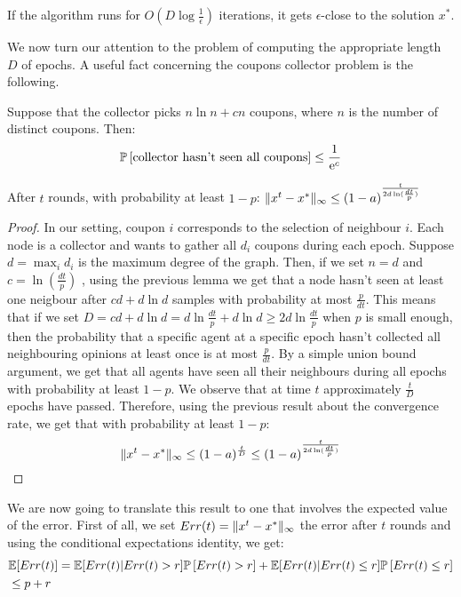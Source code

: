 \begin{corollary}
If the algorithm runs for $O(D \log \frac{1}{\epsilon})$ iterations, it gets $\epsilon$-close to the solution $x^*$.
\end{corollary}

We now turn our attention to the problem of computing the appropriate length $D$ of epochs. A useful fact concerning the coupons collector problem is the following.

\begin{lemma}
Suppose that the collector picks $n\ln n + cn$ coupons, where $n$ is the number of distinct coupons. Then: 
$$
\mathbb{P}\left[\text{collector hasn't seen all coupons}\right] \leq \frac{1}{\mathrm{e}^c}
$$
\end{lemma}

\begin{theorem}
After $t$ rounds, with probability at least $1 - p$: $\| x^{t}-x^* \|_{\infty} \leq (1-a)^{\frac{t}{2d\ln( \frac{dt}{p})} }$
\end{theorem}
\begin{proof}
In our setting, coupon $i$ corresponds to the selection of neighbour $i$. Each node is a collector and wants to gather all $d_i$ coupons during each epoch. Suppose $d = \max_i d_i$ is the maximum degree of the graph. Then, if we set $n = d$ and $c = \ln (\frac{dt}{p})$ , using the previous lemma we get that a node hasn't seen at least one neigbour after $cd + d\ln d$ samples with probability at most $\frac{p}{dt}$. This means that if we set $D = cd + d\ln d = d \ln \frac{dt}{p} + d \ln d \geq 2d\ln\frac{dt}{p} $ when $p$ is small enough, then the probability that a specific agent at a specific epoch hasn't collected all neighbouring opinions at least once is at most $\frac{p}{dt}$. By a simple union bound argument, we get that all agents have seen all their neighbours during all epochs with probability at least $1 - p$. We observe that at time $t$ approximately $\frac{t}{D}$ epochs have passed. Therefore, using the previous result about the convergence rate, we get that with probability at least $1 - p$:
$$ \| x^{t}-x^* \|_{\infty} \leq (1-a)^{\frac{t}{D}} \leq (1-a)^{\frac{t}{2d\ln( \frac{dt}{p})} }$$

\end{proof}
We are now going to translate this result to one that involves the expected value of the error. First of all, we set $Err(t) = \| x^t-x^* \|_{\infty}$ the error after $t$ rounds and using the conditional expectations identity, we get:
\begin{align*}
&\mathbb{E}[Err(t)] = \mathbb{E}[Err(t)|Err(t) > r]\mathbb{P}\left[Err(t) > r\right] +\mathbb{E}[Err(t)|Err(t) \leq r]\mathbb{P}\left[Err(t) \leq r\right]\\
&\leq p + r \\
\end{align*}
